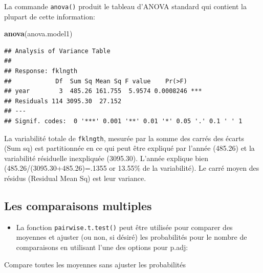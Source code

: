 \documentclass[12pt,]{book}
\newenvironment{Shaded}{\begin{snugshade}}{\end{snugshade}}
\newcommand{\DataTypeTok}[1]{\textcolor[rgb]{0.27,0.27,0.27}{#1}}
\newcommand{\KeywordTok}[1]{\textcolor[rgb]{0.27,0.27,0.27}{\textbf{#1}}}
\newcommand{\NormalTok}[1]{#1}
\newcommand{\OperatorTok}[1]{\textcolor[rgb]{0.43,0.43,0.43}{\textbf{#1}}}
\newcommand{\StringTok}[1]{\textcolor[rgb]{0.5,0.5,0.5}{#1}}
\providecommand{\tightlist}{%
  \setlength{\itemsep}{0pt}\setlength{\parskip}{0pt}}
\begin{document}
La commande \texttt{anova()} produit le tableau d'ANOVA standard qui contient la plupart de cette information:

\begin{Shaded}
\begin{Highlighting}[]
\KeywordTok{anova}\NormalTok{(anova.model1)}
\end{Highlighting}
\end{Shaded}

\begin{verbatim}
## Analysis of Variance Table
## 
## Response: fklngth
##            Df  Sum Sq Mean Sq F value    Pr(>F)    
## year        3  485.26 161.755  5.9574 0.0008246 ***
## Residuals 114 3095.30  27.152                      
## ---
## Signif. codes:  0 '***' 0.001 '**' 0.01 '*' 0.05 '.' 0.1 ' ' 1
\end{verbatim}

La variabilité totale de \texttt{fklngth}, mesurée par la somme des carrés des écarts (Sum sq) est partitionnée en ce qui peut être expliqué par l'année (485.26) et la variabilité résiduelle inexpliquée (3095.30). L'année explique bien (485.26/(3095.30+485.26)=.1355 or 13.55\% de la variabilité). Le carré moyen des résidus (Residual Mean Sq) est leur variance.

\hypertarget{les-comparaisons-multiples}{%
\subsection{Les comparaisons multiples}\label{les-comparaisons-multiples}}

\begin{itemize}
\tightlist
\item
  La fonction \texttt{pairwise.t.test()} peut être utilisée pour comparer des moyennes et ajuster (ou non, si désiré) les probabilités pour le nombre de comparaisons en utilisant l'une des options pour p.adj:
\end{itemize}

Compare toutes les moyennes sans ajuster les probabilités

\begin{Shaded}
\end{Shaded}
\end{document}
